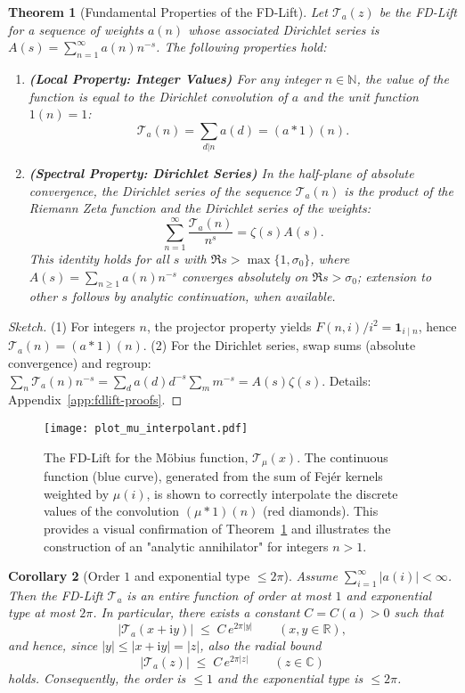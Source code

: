 \documentclass[11pt,a4paper]{amsart}
\newcommand{\C}{\mathbb{C}}
\newcommand{\R}{\mathbb{R}}
\newcommand{\N}{\mathbb{N}}
\newcommand{\ii}{\mathrm{i}}
\theoremstyle{plain}
\newtheorem{theorem}{Theorem}[section]
\newtheorem{corollary}[theorem]{Corollary}
\theoremstyle{definition}
\theoremstyle{remark}
\begin{document}
\begin{theorem}[Fundamental Properties of the FD-Lift]\label{thm:fd-lift-core}
Let $\mathcal{T}_a(z)$ be the FD-Lift for a sequence of weights $a(n)$ whose associated Dirichlet series is $A(s) = \sum_{n=1}^\infty a(n)n^{-s}$. The following properties hold:
\begin{enumerate}
    \item \textbf{(Local Property: Integer Values)} For any integer $n \in \N$, the value of the function is equal to the Dirichlet convolution of $a$ and the unit function $1(n)=1$:
    \[
    \mathcal{T}_a(n) = \sum_{d|n} a(d) = (a*1)(n).
    \]
    \item \textbf{(Spectral Property: Dirichlet Series)} In the half-plane of absolute convergence, the Dirichlet series of the sequence $\mathcal{T}_a(n)$ is the product of the Riemann Zeta function and the Dirichlet series of the weights:
    \[
    \sum_{n=1}^{\infty}\frac{\mathcal{T}_a(n)}{n^s} = \zeta(s)A(s).
    \]
    This identity holds for all $s$ with $\Re s>\max\{1,\sigma_0\}$, where $A(s)=\sum_{n\ge1} a(n)n^{-s}$ converges absolutely on $\Re s>\sigma_0$; extension to other $s$ follows by analytic continuation, when available.
\end{enumerate}
\end{theorem}
\begin{proof}[Sketch]
(1) For integers $n$, the projector property yields $F(n,i)/i^2=\mathbf{1}_{i\mid n}$, hence $\mathcal T_a(n)=(a*1)(n)$.
(2) For the Dirichlet series, swap sums (absolute convergence) and regroup: $\sum_n \mathcal T_a(n)n^{-s}
= \sum_d a(d)d^{-s}\sum_m m^{-s} = A(s)\zeta(s)$.
Details: Appendix~\ref{app:fdlift-proofs}.
\end{proof}

\begin{figure}[!htbp]
\centering
\texttt{[image: plot\_mu\_interpolant.pdf]}
\caption{The FD-Lift for the M\"obius function, $\mathcal{T}_\mu(x)$. The continuous function (blue curve), generated from the sum of Fej\'er kernels weighted by $\mu(i)$, is shown to correctly interpolate the discrete values of the convolution $(\mu*1)(n)$ (red diamonds). This provides a visual confirmation of Theorem~\ref{thm:fd-lift-core} and illustrates the construction of an "analytic annihilator" for integers $n>1$.}
\label{fig:mu_interpolant}
\end{figure}

\FloatBarrier 

\begin{corollary}[Order $1$ and exponential type $\le 2\pi$]
Assume $\sum_{i=1}^{\infty} |a(i)| < \infty$. Then the FD-Lift $\mathcal{T}_a$ is an entire function of order at most $1$ and exponential type at most $2\pi$. In particular, there exists a constant $C=C(a)>0$ such that
\[
|\mathcal{T}_a(x+\ii y)| \;\le\; C\, e^{2\pi |y|} \qquad (x,y\in\R),
\]
and hence, since $|y|\le |x+\ii y|=|z|$, also the radial bound
\[
|\mathcal{T}_a(z)| \;\le\; C\, e^{2\pi |z|} \qquad (z\in\C)
\]
holds. Consequently, the order is $\le 1$ and the exponential type is $\le 2\pi$.
\end{corollary}
\end{document}
